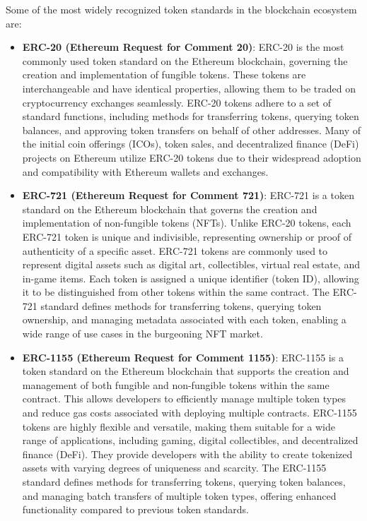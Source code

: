 Some of the most widely recognized token standards in the blockchain ecosystem are:
\begin{itemize}
    \item \textbf{ERC-20 (Ethereum Request for Comment 20)}: ERC-20 is the most commonly used token standard on the Ethereum blockchain, governing the creation and implementation of fungible tokens. These tokens are interchangeable and have identical properties, allowing them to be traded on cryptocurrency exchanges seamlessly. ERC-20 tokens adhere to a set of standard functions, including methods for transferring tokens, querying token balances, and approving token transfers on behalf of other addresses. Many of the initial coin offerings (ICOs), token sales, and decentralized finance (DeFi) projects on Ethereum utilize ERC-20 tokens due to their widespread adoption and compatibility with Ethereum wallets and exchanges.
    \item \textbf{ERC-721 (Ethereum Request for Comment 721)}: ERC-721 is a token standard on the Ethereum blockchain that governs the creation and implementation of non-fungible tokens (NFTs). Unlike ERC-20 tokens, each ERC-721 token is unique and indivisible, representing ownership or proof of authenticity of a specific asset. ERC-721 tokens are commonly used to represent digital assets such as digital art, collectibles, virtual real estate, and in-game items. Each token is assigned a unique identifier (token ID), allowing it to be distinguished from other tokens within the same contract. The ERC-721 standard defines methods for transferring tokens, querying token ownership, and managing metadata associated with each token, enabling a wide range of use cases in the burgeoning NFT market.
    \item \textbf{ERC-1155 (Ethereum Request for Comment 1155)}: ERC-1155 is a token standard on the Ethereum blockchain that supports the creation and management of both fungible and non-fungible tokens within the same contract. This allows developers to efficiently manage multiple token types and reduce gas costs associated with deploying multiple contracts. ERC-1155 tokens are highly flexible and versatile, making them suitable for a wide range of applications, including gaming, digital collectibles, and decentralized finance (DeFi). They provide developers with the ability to create tokenized assets with varying degrees of uniqueness and scarcity. The ERC-1155 standard defines methods for transferring tokens, querying token balances, and managing batch transfers of multiple token types, offering enhanced functionality compared to previous token standards.
\end{itemize}

